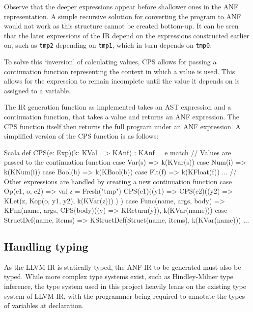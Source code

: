 Observe that the deeper expressions appear before shallower ones in the ANF
representation. A simple recursive solution for converting the program to ANF would not work as this
structure cannot be created bottom-up. It can be seen that the later expressions of the IR depend on
the expressions constructed earlier on, such as \texttt{tmp2} depending on \texttt{tmp1}, which in
turn depends on \texttt{tmp0}.

To solve this `inversion' of calculating values, CPS allows for passing a continuation function
representing the context in which a value is used. This allows for the expression to remain
incomplete until the value it depends on is assigned to a variable.

The IR generation function as implemented takes an AST expression and a continuation function, that
takes a value and returns an ANF expression. The CPS function itself then returns the full program
under an ANF expression. A simplified version of the CPS function is as follows:

\begin{code}{Scala}
    def CPS(e: Exp)(k: KVal => KAnf) : KAnf = e match {
        // Values are passed to the continuation function
        case Var(s) => k(KVar(s))
        case Num(i) => k(KNum(i))
        case Bool(b) => k(KBool(b))
        case Flt(f) => k(KFloat(f))
        ...
        // Other expressions are handled by creating a new continuation function
        case Op(e1, o, e2) => {
            val z = Fresh("tmp")
            CPS(e1)((y1) =>
                CPS(e2)((y2) =>
                    KLet(z, Kop(o, y1, y2), k(KVar(z)))
                )
            )
        }
        case Func(name, args, body) =>
            KFun(name, args, CPS(body)((y) => KReturn(y)), k(KVar(name)))
        case StructDef(name, items) =>
            KStructDef(Struct(name, items), k(KVar(name)))
        ...
    }
\end{code}

\subsection{Handling typing}

As the LLVM IR is statically typed, the ANF IR to be generated must also be typed. While more
complex type systems exist, such as Hindley-Milner type inference, the type system used in this
project heavily leans on the existing type system of LLVM IR, with the programmer being required to
annotate the types of variables at declaration.

